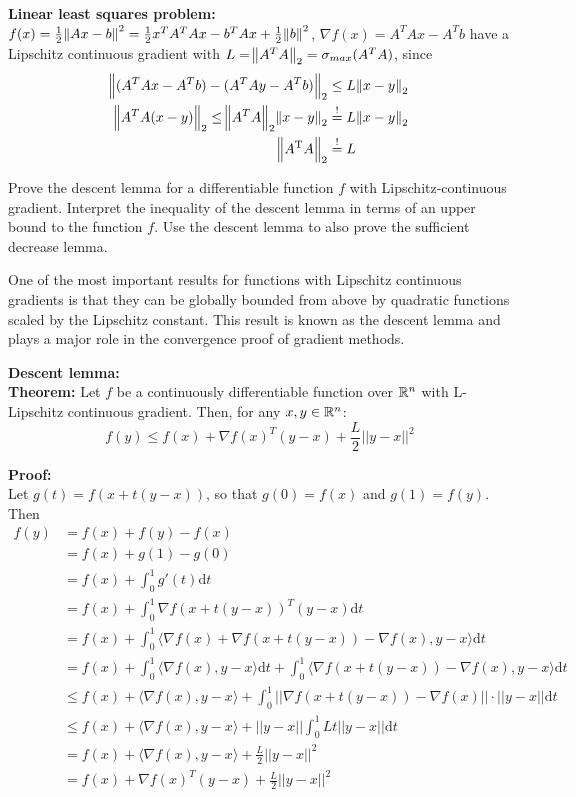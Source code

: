 \documentclass[12pt,a4paper]{article}
\begin{document}
\textbf{Linear least squares problem:} $f(x) = \frac{1}{2} \norm{Ax - b}^2 = \frac{1}{2}x^T A^T Ax -b^TAx + \frac{1}{2} \norm{b}^2$, $\nabla f(x) = A^TAx - A^Tb$ have a Lipschitz continuous gradient with $L=\norm{A^TA}_2 = \sigma_{max}(A^TA)$, since
\begin{align*}
    \norm{(A^TAx-A^Tb) - (A^TAy - A^Tb)}_2 &\leq L \norm{x-y}_2\\
    \norm{A^TA(x-y)}_2 \leq \norm{A^TA}_2\norm{x-y}_2 &\stackrel{!}{=} L \norm{x-y}_2\\
    \norm{A^{\mathrm{T}}A}_2 &\stackrel{!}{=} L
\end{align*}
\begin{question}
Prove the descent lemma for a differentiable function $f$ with Lipschitz-continuous gradient. Interpret the inequality of the descent lemma in terms of an upper bound to the function $f$. Use the descent lemma to also prove the sufficient decrease lemma.
\end{question}

One of the most important results for functions with Lipschitz continuous gradients is that they can be globally bounded from above by quadratic functions scaled by the Lipschitz constant.
This result is known as the descent lemma and plays a major role in the convergence proof of gradient methods.


\textbf{Descent lemma:}\\
\textbf{Theorem:} Let $f$ be a continuously differentiable function over $\mathbb{R}^n$ with L-Lipschitz continuous gradient. Then, for any $x, y \in \mathbb{R}^n$:
\begin{equation*}
    f(y) \leq f(x) + \nabla f(x)^T(y-x)+\frac{L}{2} ||y-x||^2
\end{equation*}

\textbf{Proof:}\\
Let $g(t) = f(x + t(y-x))$, so that $g(0)=f(x)$ and $g(1)=f(y)$.
Then
\begin{align}
    f(y) &= f(x) + f(y) - f(x)\\
         &= f(x) + g(1) - g(0)\\
         &= f(x) + \int_{0}^{1} g'(t) \text{d}t\\
         &= f(x) + \int_{0}^{1} \nabla f(x + t(y-x))^T(y-x)\text{d}t\\
         &= f(x) + \int_{0}^{1} \langle \nabla f(x) + \nabla f(x + t(y-x)) - \nabla f(x), y-x \rangle \text{d}t\\
         &= f(x) + \int_{0}^{1} \langle \nabla f(x), y-x \rangle \text{d}t + \int_{0}^{1} \langle \nabla f(x + t(y-x)) - \nabla f(x), y-x \rangle \text{d}t\\
         &\leq f(x) + \langle \nabla f(x), y-x \rangle + \int_{0}^{1} || \nabla f(x + t(y-x)) - \nabla f(x) || \cdot ||y-x|| \text{d}t\\
         &\leq f(x) + \langle \nabla f(x),y-x \rangle + ||y-x|| \int_{0}^{1} Lt||y-x|| \text{d}t\\
         &= f(x) + \langle \nabla f(x) ,y-x \rangle + \frac{L}{2} ||y-x||^2\\
         &= f(x) + \nabla f(x)^T (y-x) + \frac{L}{2} ||y-x||^2
\end{align}
\end{document}
